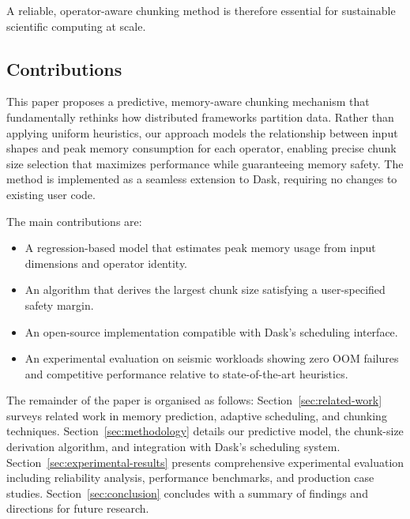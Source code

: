 A reliable, operator-aware chunking method is therefore essential for sustainable scientific computing at scale.

\subsection{Contributions}

This paper proposes a predictive, memory-aware chunking mechanism that fundamentally rethinks how distributed frameworks partition data.
Rather than applying uniform heuristics, our approach models the relationship between input shapes and peak memory consumption for each operator, enabling precise chunk size selection that maximizes performance while guaranteeing memory safety.
The method is implemented as a seamless extension to Dask, requiring no changes to existing user code.

The main contributions are:

\begin{itemize}
    \item A regression-based model that estimates peak memory usage from input dimensions and operator identity.
    \item An algorithm that derives the largest chunk size satisfying a user-specified safety margin.
    \item An open-source implementation compatible with Dask's scheduling interface.
    \item An experimental evaluation on seismic workloads showing zero \ac{OOM} failures and competitive performance relative to state-of-the-art heuristics.
\end{itemize}

The remainder of the paper is organised as follows: Section~\ref{sec:related-work} surveys related work in memory prediction, adaptive scheduling, and chunking techniques.
Section~\ref{sec:methodology} details our predictive model, the chunk-size derivation algorithm, and integration with Dask's scheduling system.
Section~\ref{sec:experimental-results} presents comprehensive experimental evaluation including reliability analysis, performance benchmarks, and production case studies.
Section~\ref{sec:conclusion} concludes with a summary of findings and directions for future research.